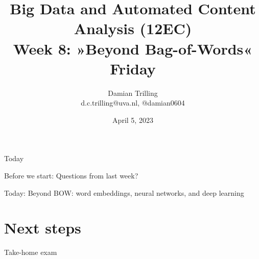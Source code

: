

\graphicspath{{../../resources/img/}}




\title[Big Data and Automated Content Analysis]{\textbf{Big Data and Automated Content Analysis (12EC)} 
\\Week 8: »Beyond Bag-of-Words«
\\Friday}
\author[Damian Trilling]{Damian Trilling\\ \footnotesize{d.c.trilling@uva.nl, @damian0604 \\}}
\date{April 5, 2023}


\begin{frame}{}
	\titlepage
\end{frame}

\begin{frame}{Today}
	\tableofcontents
\end{frame}
\begin{frame}[standout]
Before we start: Questions from last week?
\end{frame}


\begin{frame}[standout]
Today: Beyond BOW: word embeddings, neural networks, and deep learning
\end{frame}









\section{Next steps}
\begin{frame}[standout]
Take-home exam
\end{frame}


\begin{frame}
\printbibliography
\end{frame}




